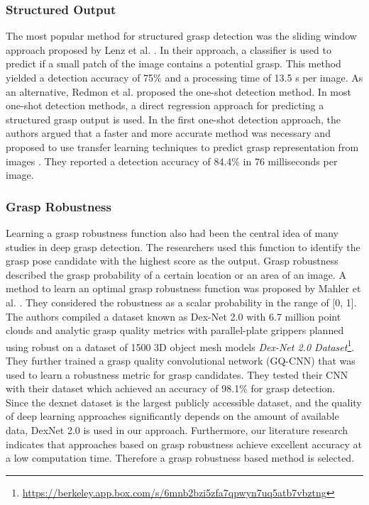\documentclass[a4paper]{article}
\begin{document}
\subsubsection{Structured Output}
The most popular method for structured grasp detection was the sliding window approach proposed by Lenz et al. \cite{18_erhan2014scalable}. 
In their approach, a classifier is used to predict if a small patch of the image contains a potential grasp.
This method yielded a detection accuracy of 75\% and a processing time of 13.5 s per image.
As an alternative, Redmon et al. \cite{19_redmon2015real} proposed the one-shot detection method.
In most one-shot detection methods, a direct regression approach for predicting a structured grasp output is used. 
In the first one-shot detection approach, the authors argued that a faster and more accurate method was necessary and proposed to use transfer learning techniques to predict grasp representation from images \cite{19_redmon2015real}. 
They reported a detection accuracy of 84.4\% in 76 milliseconds per image.

\subsubsection{Grasp Robustness}
Learning a grasp robustness function also had been the central idea of many studies in deep grasp detection. 
The researchers used this function to identify the grasp pose candidate with the highest score as the output. 
Grasp robustness described the grasp probability of a certain location or an area of an image.
A method to learn an optimal grasp robustness function was proposed by Mahler et al. \cite{27_mahler2017dex}.
They considered the robustness as a scalar probability in the range of [0, 1]. 
The authors compiled a dataset known as Dex-Net 2.0 with 6.7 million point clouds and analytic grasp quality metrics with
parallel-plate grippers planned using robust on a dataset of 1500 3D object mesh models \textit{Dex-Net 2.0 Dataset}\footnote{\url{https://berkeley.app.box.com/s/6mnb2bzi5zfa7qpwyn7uq5atb7vbztng}}. 
They further trained a grasp quality convolutional network (GQ-CNN) that was used to learn a robustness metric for grasp candidates. They tested their CNN with their dataset which achieved an accuracy of 98.1\% for grasp detection.
\\
 
Since the dexnet dataset is the largest publicly accessible dataset, and the quality of deep learning approaches significantly depends on the amount of available data, DexNet 2.0 is used in our approach.
Furthermore, our literature research indicates that approaches based on grasp robustness achieve excellent accuracy at a low computation time. 
Therefore a grasp robustness based method is selected.
\end{document}
